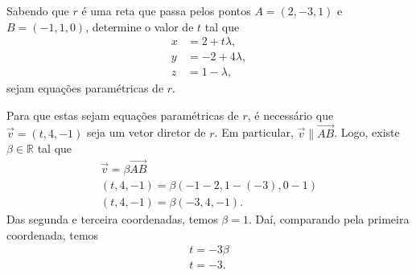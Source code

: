 \begin{exeresol}
  Sabendo que $r$ é uma reta que passa pelos pontos $A = (2,-3,1)$ e $B = (-1,1,0)$, determine o valor de $t$ tal que
  \begin{align}
    x &= 2 + t\lambda,\\
    y &= -2 + 4\lambda,\\
    z &= 1 -\lambda,
  \end{align}
  sejam equações paramétricas de $r$.
\end{exeresol}
\begin{resol}
  Para que estas sejam equações paramétricas de $r$, é necessário que $\vec{v} = (t,4,-1)$ seja um vetor diretor de $r$. Em particular, $\vec{v} \parallel \overrightarrow{AB}$. Logo, existe $\beta\in\mathbb{R}$ tal que
  \begin{gather}
    \vec{v} = \beta\overrightarrow{AB}\\
    (t,4,-1) = \beta (-1-2,1-(-3),0-1) \\
    (t,4,-1) = \beta (-3,4,-1).
  \end{gather}
  Das segunda e terceira coordenadas, temos $\beta = 1$. Daí, comparando pela primeira coordenada, temos
  \begin{gather}
    t = -3\beta\\
    t = -3.
  \end{gather}
\end{resol}

